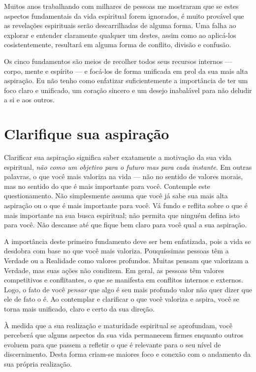 Muitos anos trabalhando com milhares de pessoas me mostraram que se estes aspectos fundamentais da vida espiritual forem ignorados, é muito provável que as revelações espirituais serão descarrilhadas de alguma forma. Uma falha ao explorar e entender claramente qualquer um destes, assim como ao aplicá-los cosistentemente, resultará em alguma forma de conflito, divisão e confusão.

Os cinco fundamentos são meios de recolher todos seus recursos internos --- corpo, mente e espírito --- e focá-los de forma unificada em prol da sua mais alta aspiração. Eu não tenho como enfatizar suficientemente a importância de ter um foco claro e unificado, um coração sincero e um desejo inabalável para não deludir a si e aos outros.

\section*{Clarifique sua aspiração}

Clarificar sua aspiração significa saber exatamente a motivação da sua vida espiritual, \emph{não como um objetivo para o futuro mas para cada instante}. Em outras palavras, o que você mais valoriza na vida --- não no sentido de valores morais, mas no sentido do que é mais importante para você. Contemple este questionamento. Não simplesmente assuma que você já sabe sua mais alta aspiração ou o que é mais importante para você. Vá fundo e reflita sobre o que é mais importante na sua busca espiritual; não permita que ninguém defina isto para você. Não descanse até que fique bem claro para você qual a sua aspiração.

A importância deste primeiro fundamento deve ser bem enfatizada, pois a vida se desdobra com base no que você mais valoriza. Pouquíssimas pessoas têm a Verdade ou a Realidade como valores profundos. Muitas pensam que valorizam a Verdade, mas suas ações não condizem. Em geral, as pessoas têm valores competitivos e conflitantes, o que se manifesta em conflitos internos e externos. Logo, o fato de você \emph{pensar} que algo é seu mais profundo valor não quer dizer que ele de fato o é. Ao contemplar e clarificar o que você valoriza e aspira, você se torna mais unificado, claro e certo da sua direção.

À medida que a sua realização e maturidade espiritual se aprofundam, você perceberá que alguns aspectos da sua vida permanecem firmes enquanto outros evoluem para que passem a refletir o que é relevante para o seu nível de discernimento. Desta forma criam-se maiores foco e conexão com o andamento da sua própria realização.

